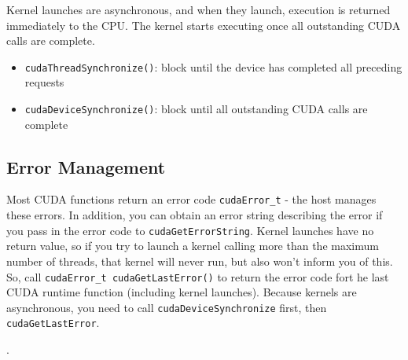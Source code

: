 \documentclass[10pt]{article}
\begin{document}
\begin{flushleft}
Kernel launches are asynchronous, and when they launch, execution is returned immediately to the CPU. The kernel starts executing once all outstanding CUDA calls are complete. 

\begin{itemize}
\item {\tt cudaThreadSynchronize()}: block until the device has completed all preceding requests
\item {\tt cudaDeviceSynchronize()}: block until all outstanding CUDA calls are complete
\end{itemize}

\subsection{Error Management}

Most CUDA functions return an error code {\tt cudaError\_t} - the host manages these errors. In addition, you can obtain an error string describing the error if you pass in the error code to {\tt cudaGetErrorString}. Kernel launches have no return value, so if you try to launch a kernel calling more than the maximum number of threads, that kernel will never run, but also won't inform you of this. So, call {\tt cudaError\_t cudaGetLastError()} to return the error code fort he last CUDA runtime function (including kernel launches). Because kernels are asynchronous, you need to call {\tt cudaDeviceSynchronize} first, then {\tt cudaGetLastError}. 

. 









\end{flushleft}
\end{document}
